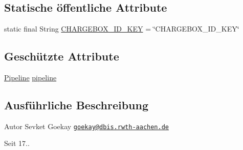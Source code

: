 \subsection*{Statische öffentliche Attribute}
\begin{DoxyCompactItemize}
\item 
static final String \hyperlink{classde_1_1rwth_1_1idsg_1_1steve_1_1ocpp_1_1ws_1_1_abstract_web_socket_endpoint_a4ebea42decdb880f9f3a8a33e73cf4e7}{C\+H\+A\+R\+G\+E\+B\+O\+X\+\_\+\+I\+D\+\_\+\+K\+E\+Y} = \char`\"{}C\+H\+A\+R\+G\+E\+B\+O\+X\+\_\+\+I\+D\+\_\+\+K\+E\+Y\char`\"{}
\end{DoxyCompactItemize}
\subsection*{Geschützte Attribute}
\begin{DoxyCompactItemize}
\item 
\hyperlink{interfacede_1_1rwth_1_1idsg_1_1steve_1_1ocpp_1_1ws_1_1pipeline_1_1_pipeline}{Pipeline} \hyperlink{classde_1_1rwth_1_1idsg_1_1steve_1_1ocpp_1_1ws_1_1_abstract_web_socket_endpoint_ad702702e9550fea4384b0b0e8dbf05ff}{pipeline}
\end{DoxyCompactItemize}


\subsection{Ausführliche Beschreibung}
\begin{DoxyAuthor}{Autor}
Sevket Goekay \href{mailto:goekay@dbis.rwth-aachen.de}{\tt goekay@dbis.\+rwth-\/aachen.\+de} 
\end{DoxyAuthor}
\begin{DoxySince}{Seit}
17.. 
\end{DoxySince}


